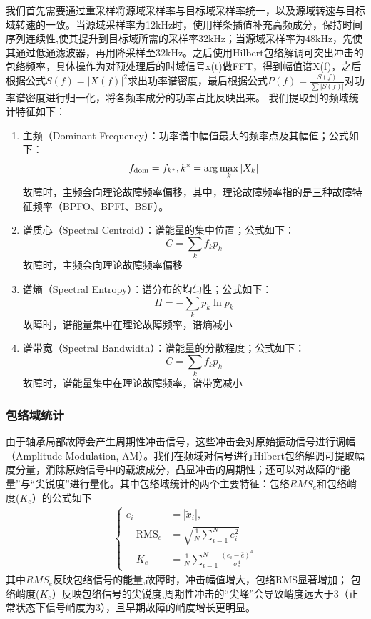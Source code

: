 \documentclass[a4paper]{CPIPC}
\numberwithin{equation}{section}
\begin{document}
我们首先需要通过重采样将源域采样率与目标域采样率统一，以及源域转速与目标域转速的一致。当源域采样率为12kHz时，使用样条插值补充高频成分，保持时间序列连续性,使其提升到目标域所需的采样率32kHz；当源域采样率为48kHz，先使其通过低通滤波器，再用降采样至32kHz。之后使用Hilbert包络解调可突出冲击的包络频率，具体操作为对预处理后的时域信号x(t)做FFT，得到幅值谱X(f)，之后根据公式$ S(f) = |X(f)|^2 $求出功率谱密度，最后根据公式$ P(f) = \frac{S(f)}{\sum |S(f)|} $对功率谱密度进行归一化，将各频率成分的功率占比反映出来。
我们提取到的频域统计特征如下：
\begin{enumerate}
    \item 主频（Dominant Frequency）：功率谱中幅值最大的频率点及其幅值；公式如下：
     \begin{equation}
       f_{\text{dom}} = f_{k^*}, \\
       k^* = \arg\max_{k} |X_k|
    \end{equation}
    故障时，主频会向理论故障频率偏移，其中，理论故障频率指的是三种故障特征频率（BPFO、BPFI、BSF）。
    \item 谱质心（Spectral Centroid）：谱能量的集中位置；公式如下：
     \begin{equation}
        C = \sum_{k} f_k p_k 
    \end{equation}
    故障时，主频会向理论故障频率偏移
    \item 谱熵（Spectral Entropy）：谱分布的均匀性；公式如下：
     \begin{equation}
         H = -\sum_{k} p_k \ln p_k 
    \end{equation}
    故障时，谱能量集中在理论故障频率，谱熵减小
    \item 谱带宽（Spectral Bandwidth）：谱能量的分散程度；公式如下：
     \begin{equation}
        C = \sum_{k} f_k p_k 
    \end{equation}
    故障时，谱能量集中在理论故障频率，谱带宽减小
\end{enumerate}

\subsubsection{包络域统计}
由于轴承局部故障会产生周期性冲击信号，这些冲击会对原始振动信号进行调幅（Amplitude Modulation, AM）。我们在频域对信号进行Hilbert包络解调可提取幅度分量，消除原始信号中的载波成分，凸显冲击的周期性；还可以对故障的“能量”与“尖锐度”进行量化。其中包络域统计的两个主要特征：包络$RMS_e$和包络峭度($K_e$）的公式如下
\begin{align}
    \left\{
    \begin{aligned}
     e_i &= |\tilde{x}_i|, \\
     \quad \text{RMS}_e &= \sqrt{\frac{1}{N} \sum_{i=1}^{N} e_i^2}\\
     \quad K_e &= \frac{1}{N} \sum_{i=1}^{N} \frac{(e_i - \bar{e})^4}{\sigma_e^4} 
      \end{aligned} 
    \right.
\end{align}
其中$RMS_e$反映包络信号的能量,故障时，冲击幅值增大，包络RMS显著增加；
包络峭度($K_e$）反映包络信号的尖锐度,周期性冲击的“尖峰”会导致峭度远大于3（正常状态下信号峭度为3），且早期故障的峭度增长更明显。
\end{document}
